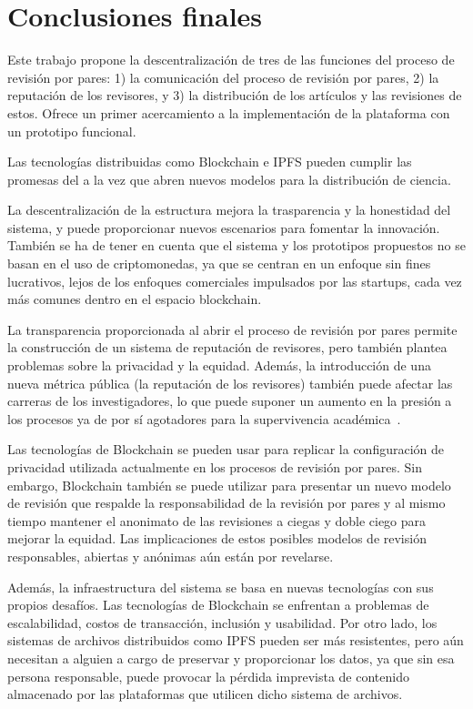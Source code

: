 
\section{Conclusiones finales}

Este trabajo propone la descentralización de tres de las funciones del proceso
de revisión por pares: 1) la comunicación del proceso de revisión por pares, 2)
la reputación de los revisores, y 3) la distribución de los artículos y las
revisiones de estos. Ofrece un primer acercamiento a la implementación de la
plataforma con un prototipo funcional.

Las tecnologías distribuidas como Blockchain e IPFS pueden cumplir las promesas
del  a la vez que abren nuevos modelos para la distribución de
ciencia.

La descentralización de la estructura mejora la trasparencia y la honestidad del
sistema, y puede proporcionar nuevos escenarios para fomentar la innovación.
También se ha de tener en cuenta que el sistema y los prototipos propuestos no
se basan en el uso de criptomonedas, ya que se centran en un enfoque sin fines
lucrativos, lejos de los enfoques comerciales impulsados ​​por las startups, cada
vez más comunes dentro en el espacio blockchain.

La transparencia proporcionada al abrir el proceso de revisión por pares permite
la construcción de un sistema de reputación de revisores, pero también plantea
problemas sobre la privacidad y la equidad. Además, la introducción de una nueva
métrica pública (la reputación de los revisores) también puede afectar las
carreras de los investigadores, lo que puede suponer un aumento en la presión a
los procesos ya de por sí agotadores para la supervivencia
académica~\cite{de2005publish}.

Las tecnologías de Blockchain se pueden usar para replicar la configuración de
privacidad utilizada actualmente en los procesos de revisión por pares. Sin
embargo, Blockchain también se puede utilizar para presentar un nuevo modelo de
revisión que respalde la responsabilidad de la revisión por pares y al mismo
tiempo mantener el anonimato de las revisiones a ciegas y doble ciego para
mejorar la equidad. Las implicaciones de estos posibles modelos de revisión
responsables, abiertas y anónimas aún están por revelarse.


Además, la infraestructura del sistema se basa en nuevas tecnologías con sus
propios desafíos. Las tecnologías de Blockchain se enfrentan a problemas de
escalabilidad, costos de transacción, inclusión y usabilidad. Por otro lado, los
sistemas de archivos distribuidos como IPFS pueden ser más resistentes, pero aún
necesitan a alguien a cargo de preservar y proporcionar los datos, ya que sin
esa persona responsable, puede provocar la pérdida imprevista de contenido
almacenado por las plataformas que utilicen dicho sistema de archivos.

